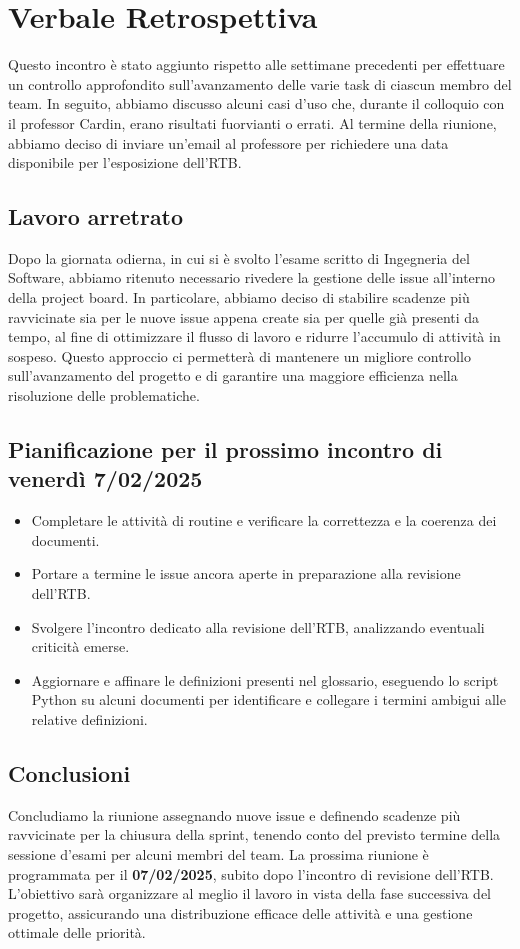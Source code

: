 \documentclass{article}
\begin{document}
\section{Verbale Retrospettiva}
Questo incontro è stato aggiunto rispetto alle settimane precedenti per effettuare un controllo approfondito sull'avanzamento delle varie task di ciascun membro del team. In seguito, abbiamo discusso alcuni casi d'uso che, durante il colloquio con il professor Cardin, erano risultati fuorvianti o errati. Al termine della riunione, abbiamo deciso di inviare un'email al professore per richiedere una data disponibile per l'esposizione dell'RTB.
\subsection{Lavoro arretrato}
Dopo la giornata odierna, in cui si è svolto l'esame scritto di Ingegneria del Software, abbiamo ritenuto necessario rivedere la gestione delle issue all'interno della project board. In particolare, abbiamo deciso di stabilire scadenze più ravvicinate sia per le nuove issue appena create sia per quelle già presenti da tempo, al fine di ottimizzare il flusso di lavoro e ridurre l'accumulo di attività in sospeso. Questo approccio ci permetterà di mantenere un migliore controllo sull'avanzamento del progetto e di garantire una maggiore efficienza nella risoluzione delle problematiche.

\subsection{Pianificazione per il prossimo incontro di venerdì 7/02/2025}
\begin{itemize}
    \item Completare le attività di routine e verificare la correttezza e la coerenza dei documenti.
    \item Portare a termine le issue ancora aperte in preparazione alla revisione dell'RTB.
    \item Svolgere l'incontro dedicato alla revisione dell'RTB, analizzando eventuali criticità emerse.
    \item Aggiornare e affinare le definizioni presenti nel glossario, eseguendo lo script Python su alcuni documenti per identificare e collegare i termini ambigui alle relative definizioni.
\end{itemize}

\subsection{Conclusioni}
Concludiamo la riunione assegnando nuove issue e definendo scadenze più ravvicinate per la chiusura della sprint, tenendo conto del previsto termine della sessione d'esami per alcuni membri del team.
La prossima riunione è programmata per il \textbf{07/02/2025}, subito dopo l'incontro di revisione dell'RTB. L'obiettivo sarà organizzare al meglio il lavoro in vista della fase successiva del progetto, assicurando una distribuzione efficace delle attività e una gestione ottimale delle priorità.
\end{document}
